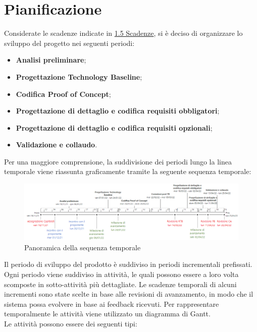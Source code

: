 \section{Pianificazione} \label{section:pianificazione}

Considerate le scadenze indicate in \hyperref[subsection:intro_scadenze]{1.5 Scadenze}, si è deciso di organizzare lo sviluppo del progetto nei seguenti periodi:
\begin{itemize}
  \item \textbf{Analisi preliminare};
  \item \textbf{Progettazione Technology Baseline};
  \item \textbf{Codifica Proof of Concept\glo{}};
  \item \textbf{Progettazione di dettaglio e codifica requisiti obbligatori};
  \item \textbf{Progettazione di dettaglio e codifica requisiti opzionali};
  \item \textbf{Validazione e collaudo}.
\end{itemize}
Per una maggiore comprensione, la suddivisione dei periodi lungo la linea temporale viene riassunta graficamente tramite la seguente sequenza temporale:
\begin{figure}[H]
  \centering
  \includegraphics[scale=0.6]{immagini/sequenza_temporale.png}
  \caption{Panoramica della sequenza temporale}
\end{figure}
Il periodo di sviluppo del prodotto è suddiviso in periodi incrementali prefissati. Ogni periodo viene suddiviso in attività, le quali possono essere a loro volta scomposte in sotto-attività più dettagliate.
Le scadenze temporali di alcuni incrementi sono state scelte in base alle revisioni di avanzamento, in modo che il sistema possa evolvere in base ai feedback ricevuti.
Per rappresentare temporalmente le attività viene utilizzato un diagramma di Gantt\glo{}.
\\Le attività possono essere dei seguenti tipi:
